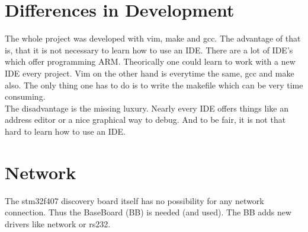 \section{Differences in Development}
The whole project was developed with vim, make and gcc.
 The advantage of that is, that it is not necessary to learn how to use an IDE.
 There are a lot of IDE's which offer programming ARM. Theorically one could 
learn to work with a new IDE every project. Vim on the other hand is everytime 
the same, gcc and make also. The only thing one has to do is to write the 
 makefile which can be very time consuming.\\
The disadvantage is the missing luxury. Nearly every IDE offers things like an
address editor or a nice graphical way to debug. And to be fair, it is not that
hard to learn how to use an IDE.\citep{EM-14}

\section{Network}
The stm32f407 discovery board itself has no possibility for any network connection.
Thus the BaseBoard (BB) is needed (and used). The BB adds new drivers like network
or rs232.
